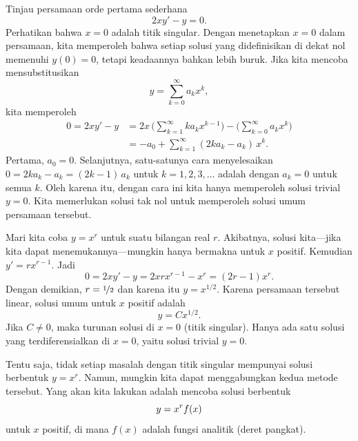 \begin{example}
Tinjau persamaan orde pertama sederhana 
\begin{equation*}
2 x y' - y = 0 .
\end{equation*}
Perhatikan bahwa $x=0$ adalah titik singular.
Dengan menetapkan $x=0$ dalam persamaan, kita memperoleh
bahwa setiap solusi yang didefinisikan di dekat nol memenuhi
$y(0)=0$, tetapi keadaannya bahkan lebih buruk.
Jika kita mencoba mensubstitusikan
\begin{equation*}
y = \sum_{k=0}^\infty a_k x^k ,
\end{equation*}
kita memperoleh
\begin{equation*}
\begin{split}
0 = 2 xy'-y &= 
2x \, \Biggl( \sum_{k=1}^\infty k a_k x^{k-1}  \Biggr)
-
\Biggl( \sum_{k=0}^\infty a_k x^k \Biggr)
\\
& =
-a_0 + 
\sum_{k=1}^\infty (2 k a_k - a_k) \, x^{k} .
\end{split}
\end{equation*}
Pertama, $a_0 = 0$. Selanjutnya, satu-satunya cara menyelesaikan
$0 = 2 k a_k - a_k = (2k-1) \, a_k$
untuk $k = 1,2,3,\dots$ adalah dengan $a_k = 0$ untuk semua $k$.
Oleh karena itu, dengan cara ini kita hanya memperoleh solusi trivial $y=0$. Kita memerlukan
solusi tak nol untuk memperoleh solusi umum persamaan tersebut.

Mari kita coba $y=x^r$
untuk suatu bilangan real $r$. 
Akibatnya, solusi kita---jika kita dapat
menemukannya---mungkin hanya bermakna untuk $x$ positif.
Kemudian $y' = r x^{r-1}$. Jadi
\begin{equation*}
0 = 2 x y' - y = 2 x r x^{r-1} - x^r = (2r-1) x^r .
\end{equation*}
Dengan demikian, $r= \nicefrac{1}{2}$ dan karena itu $y = x^{1/2}$.
Karena persamaan tersebut linear,
solusi umum untuk $x$ positif adalah
\begin{equation*}
y = C x^{1/2} .
\end{equation*}
Jika $C \neq 0$, maka
turunan solusi  di $x=0$ (titik
singular). Hanya ada satu solusi yang terdiferensialkan
di $x=0$, yaitu solusi trivial $y=0$.
\end{example}

Tentu saja, tidak setiap masalah dengan titik singular mempunyai solusi berbentuk $y=x^r$.
Namun, mungkin kita dapat menggabungkan kedua metode tersebut. Yang akan kita lakukan adalah
mencoba solusi berbentuk
\begin{equation*}
y = x^r f(x)
\avoidbreak
\end{equation*}
untuk $x$ positif,
di mana $f(x)$ adalah fungsi analitik (deret pangkat).

